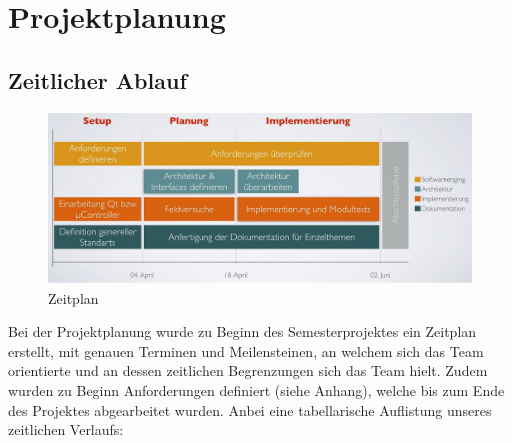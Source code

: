 \chapter{Projektplanung}
\section{Zeitlicher Ablauf}
\begin{figure}[h]
\begin{center}
  \includegraphics[width=13cm]{content/pictures/Zeitplan.jpg}
  \caption{Zeitplan}
  \label{Zeitplan}
\end{center}
\end{figure}
Bei der Projektplanung wurde zu Beginn des Semesterprojektes ein Zeitplan erstellt, mit genauen Terminen und 
Meilensteinen, an welchem sich das Team orientierte und an dessen zeitlichen Begrenzungen sich das Team hielt. 
Zudem wurden zu Beginn Anforderungen definiert (siehe Anhang), 
welche bis zum Ende des Projektes abgearbeitet wurden.
Anbei eine tabellarische Auflistung unseres zeitlichen Verlaufs:

